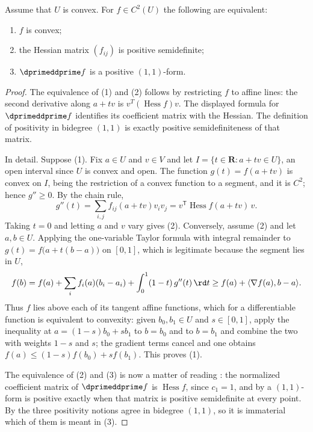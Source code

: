 \begin{theorem}
\label{thm:convex-ddc-positive}
Assume that $U$ is convex. For $f\in C^2(U)$ the following are equivalent:
\begin{enumerate}
\item $f$ is convex;
\item the Hessian matrix $(f_{ij})$ is positive semidefinite;
\item $\dprimeddprime f$ is a positive $(1,1)$-form.
\end{enumerate}
\par
\end{theorem}
\begin{proof}
The equivalence of (1) and (2) follows by restricting $f$ to affine lines:
the second derivative along $a+tv$ is $v^T(\operatorname{Hess}f)v$.
The displayed formula for $\dprimeddprime f$ identifies its coefficient matrix with
the Hessian. The definition of positivity in bidegree $(1,1)$ is exactly
positive semidefiniteness of that matrix.

In detail.  Suppose (1).  Fix $a\in U$ and $v\in V$ and let
$I=\{t\in\mathbf R:a+tv\in U\}$, an open interval since $U$ is convex and
open.  The function $g(t)=f(a+tv)$ is convex on $I$, being the restriction of
a convex function to a segment, and it is $C^2$; hence $g''\geq0$.  By the
chain rule,
\[
 g''(t)=\sum_{i,j}f_{ij}(a+tv)v_iv_j
 =v^{\mathsf T}\operatorname{Hess}f(a+tv)\,v .
\]
Taking $t=0$ and letting $a$ and $v$ vary gives (2).  Conversely, assume (2)
and let $a,b\in U$.  Applying the one-variable Taylor formula with integral
remainder to $g(t)=f\bigl(a+t(b-a)\bigr)$ on $[0,1]$, which is legitimate
because the segment lies in $U$,
\[
 f(b)=f(a)+\sum_if_i(a)(b_i-a_i)
   +\int_0^1(1-t)\,g''(t)\,\rd t
 \geq f(a)+\langle\nabla f(a),b-a\rangle .
\]
Thus $f$ lies above each of its tangent affine functions, which for a
differentiable function is equivalent to convexity: given
$b_0,b_1\in U$ and $s\in[0,1]$, apply the inequality at
$a=(1-s)b_0+sb_1$ to $b=b_0$ and to $b=b_1$ and combine the two with weights
$1-s$ and $s$; the gradient terms cancel and one obtains
$f(a)\leq(1-s)f(b_0)+sf(b_1)$.  This proves (1).

The equivalence of (2) and (3) is now a matter of reading
: the normalized coefficient matrix of
$\dprimeddprime f$ is $\operatorname{Hess}f$, since $c_1=1$, and by
 a $(1,1)$-form is positive exactly when
that matrix is positive semidefinite at every point.  By
 the three positivity notions agree in
bidegree $(1,1)$, so it is immaterial which of them is meant in (3).
\end{proof}

